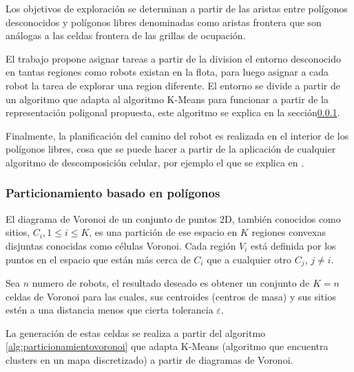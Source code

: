 Los objetivos de exploración se determinan a partir de las aristas entre polígonos desconocidos y polígonos libres denominadas como aristas frontera que son análogas a las celdas frontera de las grillas de ocupación.

El trabajo propone asignar tareas a partir de la division el entorno desconocido en tantas regiones como robots existan en la flota, para luego asignar a cada robot la tarea de explorar una region diferente. El entorno se divide a partir de un algoritmo que adapta al algoritmo K-Means para funcionar a partir de la representación poligonal propuesta, este algoritmo se explica en la sección\ref{subsubsec:particionamientovoronoi}.


Finalmente, la planificación del camino del robot es realizada en el interior de los polígonos libres, cosa que se puede hacer a partir de la aplicación de cualquier algoritmo de descomposición celular, por ejemplo el que se explica en \cite{schachter1978decomposition}.
   
\subsubsection{Particionamiento basado en polígonos}\label{subsubsec:particionamientovoronoi}
El diagrama de Voronoi\cite{fortune1987sweepline} de un conjunto de puntos 2D, también conocidos como sitios, $C_{i} , 1 \leq i \leq K$, es una partición de ese espacio en $K$ regiones convexas disjuntas conocidas como células Voronoi. Cada región $V_i$ está definida por los puntos en el espacio que están más cerca de $C_{i}$ que a cualquier otro $C_{j}$, $j\neq i$. 

Sea $n$ numero de robots, el resultado deseado es obtener un conjunto de $K=n$ celdas de Voronoi para las cuales, sus centroides (centros de masa) y sus sitios estén a una distancia menos que cierta tolerancia $\varepsilon$. %

La generación de estas celdas se realiza a partir del algoritmo \ref{alg:particionamientovoronoi} que adapta K-Means (algoritmo que encuentra clusters en un mapa discretizado) a partir de diagramas de Voronoi.

